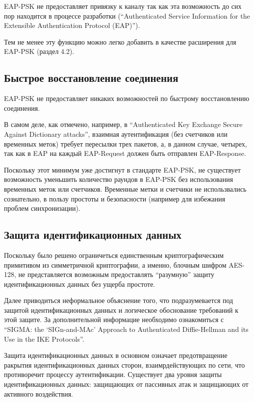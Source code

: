 EAP-PSK не предоставляет привязку к каналу так как эта возможность до сих пор находится в процессе разработки (``Authenticated Service Information for the Extensible Authentication Protocol (EAP)'').

Тем не менее эту функцию можно легко добавить в качестве расширения для EAP-PSK (раздел 4.2).

\subsection{Быстрое восстановление соединения}

EAP-PSK не предоставляет никаких возможностей по быстрому восстановлению соединения.

В самом деле, как отмечено, например, в ``Authenticated Key Exchange Secure Against Dictionary attacks'', взаимная аутентификация (без счетчиков или временных меток) требует пересылки трех пакетов, а, в данном случае, четырех, так как в EAP на каждый EAP-Request должен быть отправлен EAP-Response.

Поскольку этот минимум уже достигнут в стандарте EAP-PSK, не существует возможность уменьшить количество раундов в EAP-PSK без использования временных меток или счетчиков. Временные метки и счетчики не использвались сознательно, в пользу простоты и безопасности (например для избежания проблем синхронизации).

\subsection{Защита идентификационных данных}

Поскольку было решено ограничеться единственным криптографическим примитивом из симметричной криптографии, а именно, блочным шифром AES-128, не представляется возможным предоставлять ``разумную'' защиту идентификационных данных без ущерба простоте.

Далее приводиться неформальное объяснение того, что подразумевается под защитой идентификационных данных и логическое обоснование требований к этой защите. За дополнительной информацие необходимо ознакомиться с ``SIGMA: the `SIGn-and-MAc' Approach to Authenticated Diffie-Hellman and its Use in the IKE Protocols''.

Защита идентификационных данных в основном означает предотвращение ракрытия идентификационных данных сторон, взаимрдействующих по сети, что противоречит процессу аутентификации. Существует два уровня защиты идентификационных данных: защищающих от пассивных атак и защищающих от активного воздействия.

